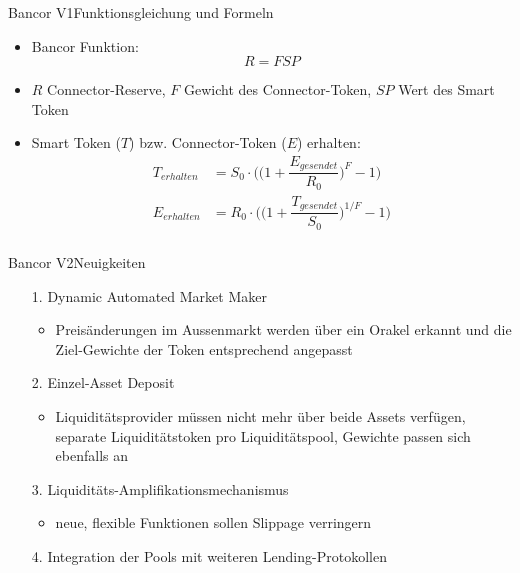 \documentclass{beamer}
\begin{document}
\begin{frame}{Bancor V1}{Funktionsgleichung und Formeln}
\begin{itemize}
 \item<1->{Bancor Funktion:
  \begin{equation}
  R = FSP
  \end{equation}
  }
  \item<1->{$R$ Connector-Reserve, $F$ Gewicht des Connector-Token, $SP$ Wert des Smart Token}
 \vspace{2em}
  \item<2->{Smart Token ($T$) bzw. Connector-Token ($E$) erhalten:
\begin{align*}
T_{erhalten}  &= S_{0} \cdot \Biggl(\biggl(1+\dfrac{E_{gesendet}}{R_{0}}\biggr)^{F} -1 \Biggr) \\
E_{erhalten} &= R_{0} \cdot \Biggl(\biggl(1+\dfrac{T_{gesendet}}{S_{0}}\biggr)^{1/F} -1\Biggr) \\
\end{align*}
}
\end{itemize}
\end{frame}


\begin{frame}{Bancor V2}{Neuigkeiten}
\begin{itemize}
  \item[1.]{Dynamic Automated Market Maker} \begin{itemize} \item{Preisänderungen im Aussenmarkt werden über ein Orakel erkannt und die Ziel-Gewichte der Token entsprechend angepasst}
\end{itemize}  
  \vspace{1em}
  \item[2.]{Einzel-Asset Deposit} \begin{itemize} \item{Liquiditätsprovider müssen nicht mehr über beide Assets verfügen, separate Liquiditätstoken pro Liquiditätspool, Gewichte passen sich ebenfalls an} \end{itemize}
  \vspace{1em}
  \item[3.]{Liquiditäts-Amplifikationsmechanismus} \begin{itemize} \item{neue, flexible Funktionen sollen Slippage verringern}
\end{itemize}   
  \vspace{1em}
  \item[4.]{Integration der Pools mit weiteren Lending-Protokollen} 
\end{itemize}
\end{frame}
\end{document}
